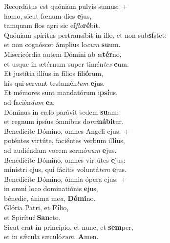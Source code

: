 \evenverse Recordátus est quóniam pulvis sumus:~+\\\evenverse  homo, sicut fœnum dies \textbf{e}jus,~\*\\
\evenverse tamquam flos agri sic ef\textit{flo}\textbf{ré}bit.\\
\oddverse Quóniam spíritus pertransíbit in illo, et non sub\textbf{sí}stet:~\*\\
\oddverse et non cognóscet ámplius lo\textit{cum} \textbf{su}um.\\
\evenverse Misericórdia autem Dómini ab æ\textbf{tér}no,~\*\\
\evenverse et usque in ætérnum super timén\textit{tes} \textbf{e}um.\\
\oddverse Et justítia illíus in fílios fili\textbf{ó}rum,~\*\\
\oddverse his qui servant testamén\textit{tum} \textbf{e}jus.\\
\evenverse Et mémores sunt mandatórum i\textbf{psí}us,~\*\\
\evenverse ad facién\textit{dum} \textbf{e}a.\\
\oddverse Dóminus in cælo parávit sedem \textbf{su}am:~\*\\
\oddverse et regnum ipsíus ómnibus do\textit{mi}\textbf{ná}\textbf{bi}tur.\\
\evenverse Benedícite Dómino, omnes Angeli ejus:~+\\
\evenverse  poténtes virtúte, faciéntes verbum il\textbf{lí}us,~\*\\
\evenverse ad audiéndam vocem sermó\textit{num} \textbf{e}jus.\\
\oddverse Benedícite Dómino, omnes virtútes \textbf{e}jus:~\*\\
\oddverse minístri ejus, qui fácitis voluntá\textit{tem} \textbf{e}jus.\\
\evenverse Benedícite Dómino, ómnia ópera ejus:~+\\
\evenverse  in omni loco dominatiónis \textbf{e}jus,~\*\\
\evenverse bénedic, ánima me\textit{a}, \textbf{Dó}\textbf{mi}no.\\
\oddverse Glória Patri, et \textbf{Fí}lio,~\*\\
\oddverse et Spirítu\textit{i} \textbf{San}cto.\\
\evenverse Sicut erat in princípio, et nunc, et \textbf{sem}per,~\*\\
\evenverse et in sǽcula sæculó\textit{rum}. \textbf{A}men.\\
